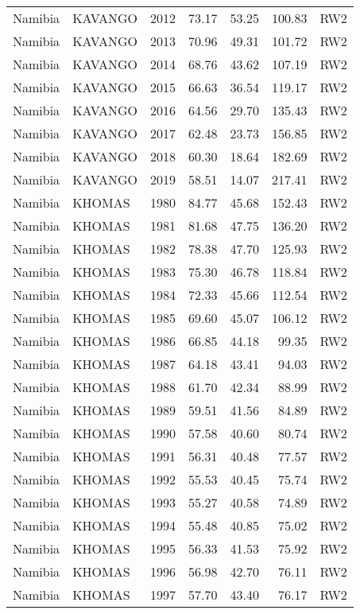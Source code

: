 \begin{longtable}{lllrrrl}
  Namibia & KAVANGO & 2012 & 73.17 & 53.25 & 100.83 & RW2 \\ 
  Namibia & KAVANGO & 2013 & 70.96 & 49.31 & 101.72 & RW2 \\ 
  Namibia & KAVANGO & 2014 & 68.76 & 43.62 & 107.19 & RW2 \\ 
  Namibia & KAVANGO & 2015 & 66.63 & 36.54 & 119.17 & RW2 \\ 
  Namibia & KAVANGO & 2016 & 64.56 & 29.70 & 135.43 & RW2 \\ 
  Namibia & KAVANGO & 2017 & 62.48 & 23.73 & 156.85 & RW2 \\ 
  Namibia & KAVANGO & 2018 & 60.30 & 18.64 & 182.69 & RW2 \\ 
  Namibia & KAVANGO & 2019 & 58.51 & 14.07 & 217.41 & RW2 \\ 
  Namibia & KHOMAS & 1980 & 84.77 & 45.68 & 152.43 & RW2 \\ 
  Namibia & KHOMAS & 1981 & 81.68 & 47.75 & 136.20 & RW2 \\ 
  Namibia & KHOMAS & 1982 & 78.38 & 47.70 & 125.93 & RW2 \\ 
  Namibia & KHOMAS & 1983 & 75.30 & 46.78 & 118.84 & RW2 \\ 
  Namibia & KHOMAS & 1984 & 72.33 & 45.66 & 112.54 & RW2 \\ 
  Namibia & KHOMAS & 1985 & 69.60 & 45.07 & 106.12 & RW2 \\ 
  Namibia & KHOMAS & 1986 & 66.85 & 44.18 & 99.35 & RW2 \\ 
  Namibia & KHOMAS & 1987 & 64.18 & 43.41 & 94.03 & RW2 \\ 
  Namibia & KHOMAS & 1988 & 61.70 & 42.34 & 88.99 & RW2 \\ 
  Namibia & KHOMAS & 1989 & 59.51 & 41.56 & 84.89 & RW2 \\ 
  Namibia & KHOMAS & 1990 & 57.58 & 40.60 & 80.74 & RW2 \\ 
  Namibia & KHOMAS & 1991 & 56.31 & 40.48 & 77.57 & RW2 \\ 
  Namibia & KHOMAS & 1992 & 55.53 & 40.45 & 75.74 & RW2 \\ 
  Namibia & KHOMAS & 1993 & 55.27 & 40.58 & 74.89 & RW2 \\ 
  Namibia & KHOMAS & 1994 & 55.48 & 40.85 & 75.02 & RW2 \\ 
  Namibia & KHOMAS & 1995 & 56.33 & 41.53 & 75.92 & RW2 \\ 
  Namibia & KHOMAS & 1996 & 56.98 & 42.70 & 76.11 & RW2 \\ 
  Namibia & KHOMAS & 1997 & 57.70 & 43.40 & 76.17 & RW2 \\ 

\end{longtable}
